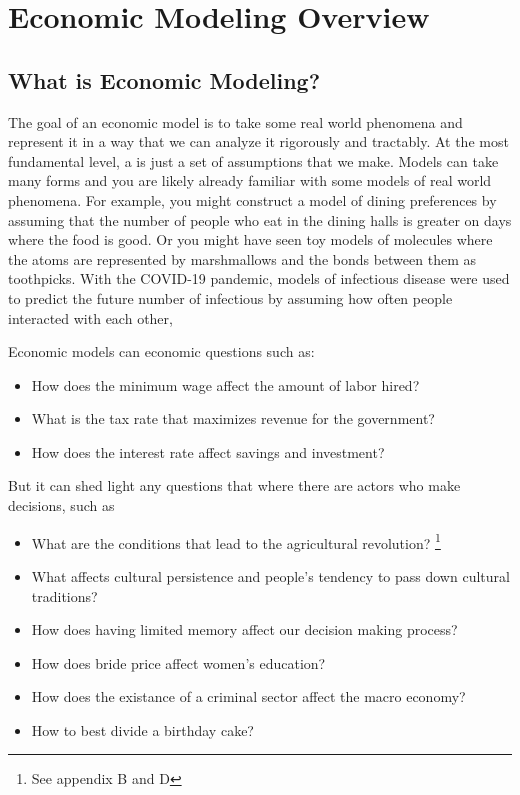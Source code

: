 \chapter{Economic Modeling Overview}

\section{What is Economic Modeling?}
The goal of an economic model is to take some real world phenomena and represent it in a way that we can analyze it rigorously and tractably. At the most fundamental level, a  is just a set of assumptions that we make. Models can take many forms and you are likely already familiar with some models of real world phenomena. For example, you might construct a model of dining preferences by assuming that the number of people who eat in the dining halls is greater on days where the food is good. Or you might have seen toy models of molecules where the atoms are represented by marshmallows and the bonds between them as toothpicks. With the COVID-19 pandemic, models of infectious disease were used to predict the future number of infectious by assuming how often people interacted with each other,  

Economic models can economic questions such as:
\begin{itemize}
    \item How does the minimum wage affect the amount of labor hired?
    \item What is the tax rate that maximizes revenue for the government?
    \item How does the interest rate affect savings and investment?
\end{itemize}
But it can shed light any questions that where there are actors who make decisions, such as
\begin{itemize}
    \item What are the conditions that lead to the agricultural revolution? \citep{origin_of_state}\footnote{See appendix B and D}
    \item What affects cultural persistence and people's tendency to pass down cultural traditions? \citep{CulturalPersistance}
    \item How does having limited memory affect our decision making process? \citep{Mullainathanmemory}
    \item How does bride price affect women's education? \citep{BridePrice}
    \item How does the existance of a criminal sector affect the macro economy? \citep{dalbodalbo}
    \item How to best divide a birthday cake? \citep{whyucry}
\end{itemize}

